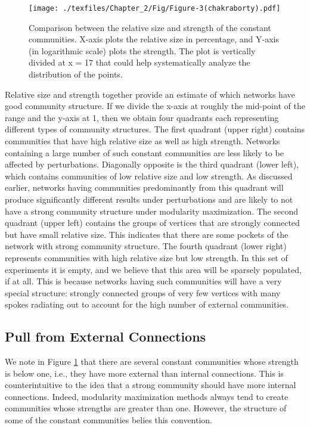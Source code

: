 \begin{figure}[!t]
\centering
\texttt{[image: ./texfiles/Chapter\_2/Fig/Figure-3(chakraborty).pdf]}
\caption{ Comparison between the relative size and strength of the constant communities. X-axis plots the
relative size in percentage, and Y-axis (in logarithmic scale) plots the strength. The plot is vertically divided at x = 17 that could help
systematically analyze the distribution of the points.
}\label{intr_extr}
\end{figure}

Relative size and strength together provide an estimate of which networks have good community structure. If we divide the x-axis at
roughly the
mid-point of the range and the y-axis at 1, then we obtain four quadrants each representing different types of community structures.
The first quadrant (upper right)
contains communities that have high relative size as well as high strength. Networks containing a large number of such constant
communities
are less likely to be affected by perturbations. Diagonally opposite is the third quadrant (lower left), which contains communities of low
relative size and low strength. As discussed earlier, networks having communities predominantly from this quadrant will produce
significantly
different results under perturbations and are likely to not have a strong community structure under modularity maximization. The second
quadrant (upper left) contains the
groups of vertices that are strongly connected but have small relative size. This indicates that there are some pockets of the network
with
strong community
structure. The fourth quadrant (lower
right) represents communities with high relative size but low strength. In this set of experiments it is empty, and we believe that
this area will be sparsely populated, if at all. This is because networks having such communities will have a very special structure:
strongly connected groups of very few vertices with many spokes radiating out to account for the high number of external communities.



\subsection{Pull from External Connections}\label{sec:rel_perm}
We note in Figure \ref{intr_extr} that there are several constant communities whose strength is below one,
i.e., they have more external than internal connections. This is counterintuitive to the idea that a strong community should have more
internal connections. Indeed, modularity maximization methods always tend to create communities whose strengths are greater than
one. However, the structure of some of the constant communities belies this convention.


